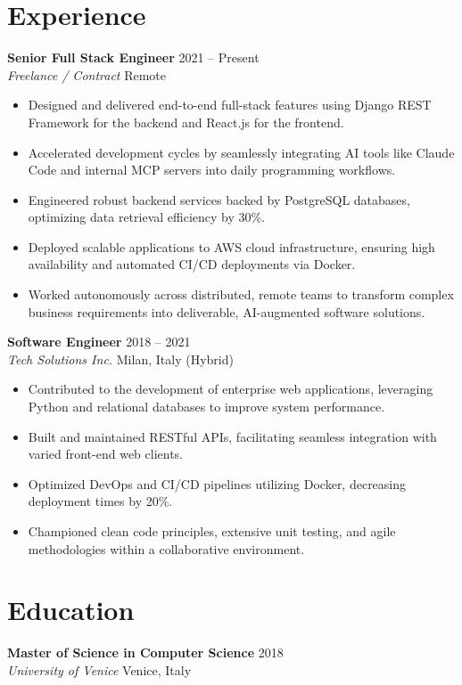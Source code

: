 \documentclass[11pt,a4paper]{article}
\begin{document}
\section*{Experience}
\noindent
\textbf{Senior Full Stack Engineer} \hfill 2021 -- Present \\
\textit{Freelance / Contract} \hfill Remote
\begin{itemize}[leftmargin=*]
    \item Designed and delivered end-to-end full-stack features using Django REST Framework for the backend and React.js for the frontend.
    \item Accelerated development cycles by seamlessly integrating AI tools like Claude Code and internal MCP servers into daily programming workflows.
    \item Engineered robust backend services backed by PostgreSQL databases, optimizing data retrieval efficiency by 30\%.
    \item Deployed scalable applications to AWS cloud infrastructure, ensuring high availability and automated CI/CD deployments via Docker.
    \item Worked autonomously across distributed, remote teams to transform complex business requirements into deliverable, AI-augmented software solutions.
\end{itemize}

\vspace{2mm}
\noindent
\textbf{Software Engineer} \hfill 2018 -- 2021 \\
\textit{Tech Solutions Inc.} \hfill Milan, Italy (Hybrid)
\begin{itemize}[leftmargin=*]
    \item Contributed to the development of enterprise web applications, leveraging Python and relational databases to improve system performance.
    \item Built and maintained RESTful APIs, facilitating seamless integration with varied front-end web clients.
    \item Optimized DevOps and CI/CD pipelines utilizing Docker, decreasing deployment times by 20\%.
    \item Championed clean code principles, extensive unit testing, and agile methodologies within a collaborative environment.
\end{itemize}

\section*{Education}
\noindent
\textbf{Master of Science in Computer Science} \hfill 2018 \\
\textit{University of Venice} \hfill Venice, Italy
\end{document}
